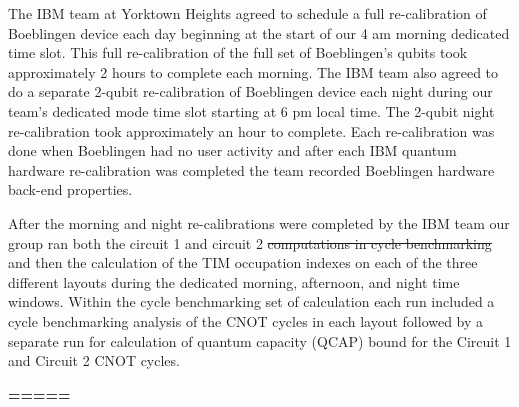 The IBM team at Yorktown Heights agreed to schedule a full re-calibration of Boeblingen device each day beginning at the start of our 4 am morning dedicated time slot. This full re-calibration of the full set of Boeblingen's qubits took approximately 2 hours to complete each morning. The IBM team also agreed to do a separate 2-qubit re-calibration of Boeblingen device each night during our team's dedicated mode time slot starting at 6 pm local time. The 2-qubit night re-calibration took approximately an hour to complete.  Each re-calibration was done when  Boeblingen had no user activity and after each IBM quantum hardware re-calibration was completed the team recorded Boeblingen hardware back-end properties.  

After the morning and night re-calibrations were completed by the IBM team our group ran  both the circuit 1 and circuit 2 \sout{computations in cycle benchmarking} and then the calculation of the TIM occupation indexes  on each of the three different layouts during the dedicated morning, afternoon, and night time windows. Within the cycle benchmarking set of calculation each run included a cycle benchmarking analysis of the CNOT cycles in each layout followed by a separate run for calculation of quantum capacity (QCAP) bound for the Circuit 1 and Circuit 2 CNOT cycles.


\textbf{=====}



